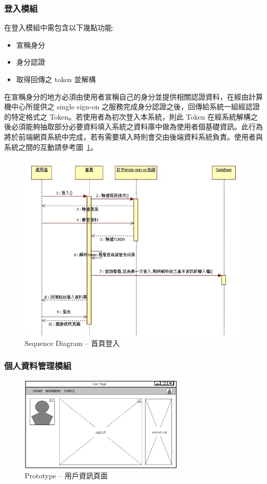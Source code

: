 \subsubsection{登入模組}
在登入模組中需包含以下幾點功能: 
\begin{itemize}
\item{宣稱身分}
\item{身分認證}
\item{取得回傳之 token 並解構}
\end{itemize}
在宣稱身分的地方必須由使用者宣稱自己的身分並提供相關認證資料，在經由計算機中心所提供之 single sign-on 之服務完成身分認證之後，回傳給系統一組經認證的特定格式之 Token。若使用者為初次登入本系統，則此 Token 在經系統解構之後必須能夠抽取部分必要資料填入系統之資料庫中做為使用者個基礎資訊。此行為將於前端網頁系統中完成，若有需要填入時則會交由後端資料系統負責。使用者與系統之間的互動請參考圖~\ref{pic:seq:login}。

\begin{figure}[H]
\centering
\includegraphics[width=.85\textwidth]{img/useseq/stage1/seqLogin.jpg}
\caption{Sequence Diagram -- 首頁登入}
\label{pic:seq:login}
\end{figure}

\subsubsection{個人資料管理模組}

\begin{figure}[H]
\centering
\includegraphics[width=0.7\textwidth]{img/prototype/UserPage.png}
\caption{Prototype -- 用戶資訊頁面}
\label{pic:pro:profile}
\end{figure}

